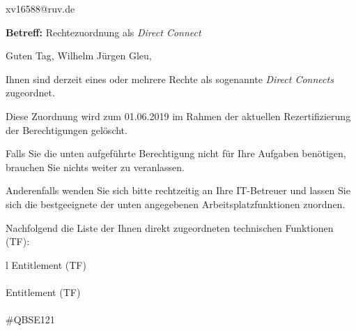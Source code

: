 \documentclass[a4paper,landscape,12pt]{letter}
\begin{document}
\begin{letter}{xv16588@ruv.de\hfill \break}
\begin{normalsize}
	\opening{\textbf{Betreff:} Rechtezuordnung als \emph{Direct Connect}}
	\begin{normalsize} \hfill
	\end{normalsize}

	\begin{normalsize}
		Guten Tag, 
	Wilhelm Jürgen Gleu, \hfill \break
	\end{normalsize}
	\end{normalsize}
	
\begin{normalsize}
	Ihnen sind derzeit eines oder mehrere Rechte als sogenannte \emph{Direct Connects} zugeordnet.
	
	Diese Zuordnung wird zum 01.06.2019 im Rahmen der aktuellen Rezertifizierung der Berechtigungen gelöscht.
	
	Falls Sie die unten aufgeführte Berechtigung nicht für Ihre Aufgaben benötigen, 
	brauchen Sie nichts weiter zu veranlassen.
	
	Anderenfalls wenden Sie sich bitte rechtzeitig an Ihre IT-Betreuer 
	und lassen Sie sich die bestgeeignete der unten angegebenen Arbeitsplatzfunktionen zuordnen.
	\end{normalsize}
	
\begin{normalsize}
	Nachfolgend die Liste der Ihnen direkt zugeordneten technischen Funktionen (TF):

	\begin{longtable}{l}
		Entitlement (TF) \\ \hline
		\endfirsthead
		\\\hline
		Entitlement (TF) \\ \hline
		\endhead %
		\multicolumn{1}{r@{}}{Fortsetzung \ldots}\\
		\endfoot
		\hline
		\endlastfoot
	\#QBSE121\\
	\end{longtable}
	\end{normalsize}
	

\end{letter}
\end{document}
